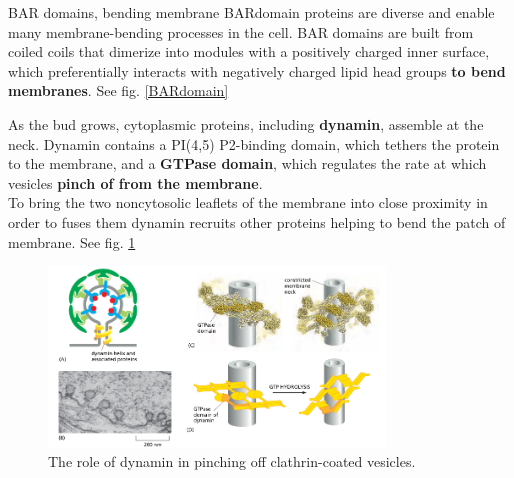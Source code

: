 \documentclass[../main.tex]{subfiles}
\begin{document}
\begin{RemarkWithTitel}{BAR domains, bending membrane}
	\gls{BARdomain} proteins are diverse and enable many membrane-bending processes in the cell. BAR domains are built from coiled coils that dimerize into modules with a positively charged inner surface, which preferentially interacts with negatively charged lipid head groups \textbf{to bend membranes}. See fig. \ref{BARdomain}  
\end{RemarkWithTitel}

\begin{figure}[H]
	\centering
	\caption{}
\end{figure}
\noindent
As the bud grows, cytoplasmic proteins, including \textbf{\gls{dynamin}}, assemble at the neck. Dynamin contains a PI(4,5)
P2-binding domain, which tethers the protein to the membrane, and a \textbf{GTPase domain}, which regulates the rate at which vesicles \textbf{pinch of from the membrane}. \\
\indent To bring the two noncytosolic leaflets of the membrane into close proximity in order to fuses them dynamin recruits other proteins helping to bend the patch of membrane.  See fig. \ref{dynamin}

\begin{figure}[H]
	\centering
	\includegraphics[width=0.8\textwidth]{10}
	\caption{The role of dynamin in pinching off clathrin-coated vesicles.}
	\label{dynamin}
\end{figure}
\end{document}
